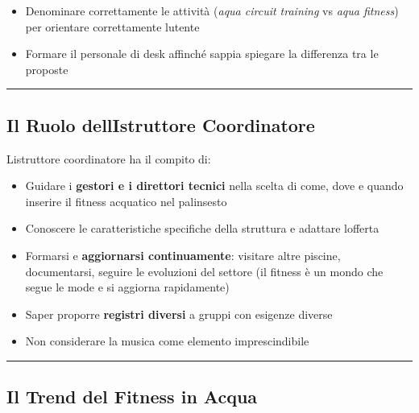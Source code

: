 \documentclass[a4paper,11pt]{article}
\providecommand{\tightlist}{%
  \setlength{\itemsep}{0pt}\setlength{\parskip}{0pt}}
\begin{document}
\begin{itemize}
      \tightlist
      \item
            Denominare correttamente le attività (\emph{aqua circuit training} vs
            \emph{aqua fitness}) per orientare correttamente
            l\textquotesingle utente
      \item
            Formare il personale di desk affinché sappia spiegare la differenza
            tra le proposte
\end{itemize}

\begin{center}\rule{0.5\linewidth}{0.5pt}\end{center}

\subsection{Il Ruolo dell\textquotesingle Istruttore
      Coordinatore}\label{il-ruolo-dellistruttore-coordinatore}

L\textquotesingle istruttore coordinatore ha il compito di:

\begin{itemize}
      \tightlist
      \item
            Guidare i \textbf{gestori e i direttori tecnici} nella scelta di come,
            dove e quando inserire il fitness acquatico nel palinsesto
      \item
            Conoscere le caratteristiche specifiche della struttura e adattare
            l\textquotesingle offerta
      \item
            Formarsi e \textbf{aggiornarsi continuamente}: visitare altre piscine,
            documentarsi, seguire le evoluzioni del settore (il fitness è un mondo
            che segue le mode e si aggiorna rapidamente)
      \item
            Saper proporre \textbf{registri diversi} a gruppi con esigenze diverse
      \item
            Non considerare la musica come elemento imprescindibile
\end{itemize}

\begin{center}\rule{0.5\linewidth}{0.5pt}\end{center}

\subsection{Il Trend del Fitness in
      Acqua}\label{il-trend-del-fitness-in-acqua}
\end{document}
